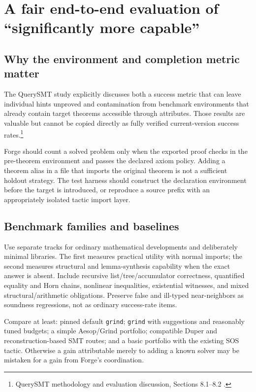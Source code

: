 \documentclass[11pt,a4paper]{article}
\newcommand{\code}[1]{\texttt{#1}}
\begin{document}
\section{A fair end-to-end evaluation of ``significantly more capable''}
\label{sec:evaluation}

\subsection{Why the environment and completion metric matter}
The QuerySMT study explicitly discusses both a success metric that can leave
individual hints unproved and contamination from benchmark environments that
already contain target theorems accessible through attributes. Those results
are valuable but cannot be copied directly as fully verified current-version
success rates.\footnote{QuerySMT methodology and evaluation discussion,
Sections 8.1--8.2 \cite{querysmt}.}

Forge should count a solved problem only when the exported proof checks in the
pre-theorem environment and passes the declared axiom policy. Adding a theorem
alias in a file that imports the original theorem is not a sufficient
holdout strategy. The test harness should construct the declaration environment
before the target is introduced, or reproduce a source prefix with an
appropriately isolated tactic import layer.

\subsection{Benchmark families and baselines}
Use separate tracks for ordinary mathematical developments and deliberately
minimal libraries. The first measures practical utility with normal imports;
the second measures structural and lemma-synthesis capability when the exact
answer is absent. Include recursive list/tree/accumulator correctness,
quantified equality and Horn chains, nonlinear inequalities, existential
witnesses, and mixed structural/arithmetic obligations. Preserve false and
ill-typed near-neighbors as soundness regressions, not as ordinary success-rate
items.

Compare at least: pinned default \code{grind}; \code{grind} with suggestions
and reasonably tuned budgets; a simple Aesop/Grind portfolio; compatible Duper
and reconstruction-based SMT routes; and a basic portfolio with the existing
SOS tactic. Otherwise a gain attributable merely to adding a known solver may
be mistaken for a gain from Forge's coordination.
\end{document}
